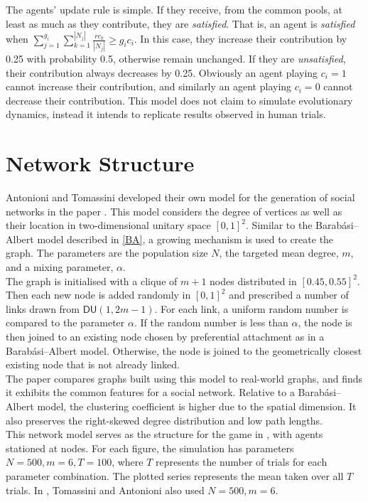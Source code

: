 The agents' update rule is simple. If they receive, from the common pools, at least as much as they contribute, they are \emph{satisfied}. That is, an agent is \emph{satisfied} when $\sum_{j=1}^{g_i} \sum_{k=1}^{|N_j|} \frac{rc_k}{|N_j|}\geq g_i c_i$. In this case, they increase their contribution by 0.25 with probability 0.5, otherwise remain unchanged. If they are \emph{unsatisfied}, their contribution always decreases by 0.25. Obviously an agent playing $c_i =1$ cannot increase their contribution, and similarly an agent playing $c_i=0$ cannot decrease their contribution. This model does not claim to simulate evolutionary dynamics, instead it intends to replicate results observed in human trials. \\


\section{Network Structure}
Antonioni and Tomassini developed their own model for the generation of social networks in the paper \cite{RN51}. This model considers the degree of vertices as well as their location in two-dimensional unitary space $[0,1]^2$. Similar to the Barab\'{a}si--Albert model described in \ref{BA}, a growing mechanism is used to create the graph. The parameters are  the population size $N$, the targeted mean degree, $m$, and  a mixing parameter, $\alpha$. \\

The graph is initialised with a clique of $m+1$ nodes distributed in $[0.45, 0.55]^2$. Then each new node is added randomly in $[0,1]^2$ and prescribed a number of links drawn from $\mathsf{DU}(1,2m-1)$. For each link, a uniform random number is compared to the parameter $\alpha$. If the random number is less than $\alpha$, the node is then joined to an existing node chosen by preferential attachment as in a Barab\'{a}si--Albert model. Otherwise, the node is joined to the geometrically closest existing node that is not already linked. \\

The paper \cite{RN51} compares graphs built using this model to real-world graphs, and finds it exhibits the common features for a social network. Relative to a Barab\'{a}si--Albert model, the clustering coefficient is higher due to the spatial dimension. It also preserves the right-skewed degree distribution and low path lengths. \\

This network model serves as the structure for the game in \cite{RN49}, with agents stationed at nodes. For each figure, the simulation has parameters $N=500, m = 6, T=100$, where $T$ represents the number of trials for each parameter combination. The plotted series represents the mean taken over all $T$ trials. In \cite{RN49}, Tomassini and Antonioni also used $N=500, m = 6$. \\

